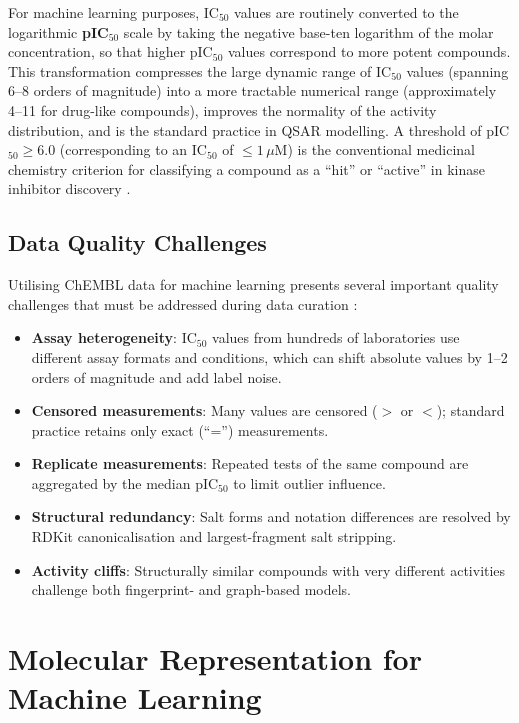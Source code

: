 For machine learning purposes, IC$_{50}$ values are routinely converted to the
logarithmic \textbf{pIC$_{50}$} scale by taking the negative base-ten logarithm of
the molar concentration, so that higher pIC$_{50}$ values correspond to more potent
compounds. This transformation compresses the large dynamic range of IC$_{50}$
values (spanning 6--8 orders of magnitude) into a more tractable numerical range
(approximately 4--11 for drug-like compounds), improves the normality of the
activity distribution, and is the standard practice in QSAR modelling.
A threshold of pIC$_{50} \geq 6.0$ (corresponding to an IC$_{50}$ of $\leq 1\,\mu$M)
is the conventional medicinal chemistry criterion for classifying a compound as a
``hit'' or ``active'' in kinase inhibitor discovery \parencite{wu2018moleculenet}.

\subsection{Data Quality Challenges}

Utilising ChEMBL data for machine learning presents several important quality
challenges that must be addressed during data curation \parencite{wu2018moleculenet}:

\begin{itemize}
    \item \textbf{Assay heterogeneity}: IC$_{50}$ values from hundreds of laboratories
    use different assay formats and conditions, which can shift absolute values by
    1--2 orders of magnitude and add label noise.
    \item \textbf{Censored measurements}: Many values are censored ($>$ or $<$);
    standard practice retains only exact (``='') measurements.
    \item \textbf{Replicate measurements}: Repeated tests of the same compound are
    aggregated by the median pIC$_{50}$ to limit outlier influence.
    \item \textbf{Structural redundancy}: Salt forms and notation differences are
    resolved by RDKit canonicalisation and largest-fragment salt stripping.
    \item \textbf{Activity cliffs}: Structurally similar compounds with very different
    activities challenge both fingerprint- and graph-based models.
\end{itemize}

\section{Molecular Representation for Machine Learning}
\label{sec:molrep}

